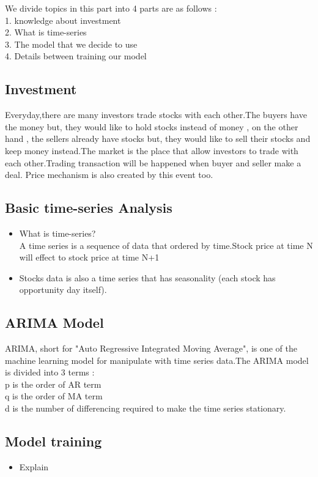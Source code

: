 \documentclass{article}
\begin{document}
We divide topics in this part into 4 parts are as follows :\\
1. knowledge about investment\\
2. What is time-series\\
3. The model that we decide to use\\
4. Details between training our model


\subsection{Investment}
Everyday,there are many investors trade stocks with each other.The buyers have the money but, they would like to hold stocks instead of money , on the other hand , the sellers already have stocks but, they would like to sell their stocks and keep money instead.The market is the place that allow investors to trade with each other.Trading transaction will be happened when buyer and seller make a deal.
Price mechanism is also created by this event too.

\subsection{Basic time-series Analysis}
\begin{itemize}
\item What is time-series?\\A time series is a sequence of data that ordered by time.Stock price at time N will 
effect to stock price at time N+1
\item Stocks data is also a time series that has seasonality (each stock has opportunity day itself).
\end{itemize}


\subsection{ARIMA Model}
ARIMA, short for "Auto Regressive Integrated Moving Average", is one of the machine learning model for manipulate with time series data.The ARIMA model is divided into 3 terms :\\p is the order of AR term\\q is the order of MA term\\d is the number of differencing required to make the time series stationary.


\subsection{Model training}
\begin{itemize}
\item Explain
\end{itemize}
\end{document}
